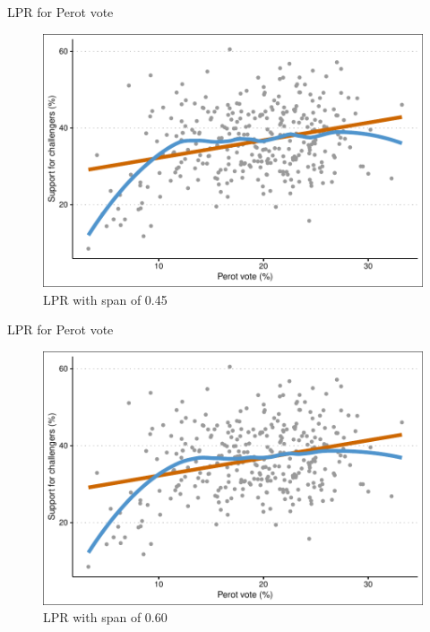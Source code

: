 \documentclass[12pt,english,pdf,xcolor=dvipsnames,aspectratio=169,handout]{beamer}\usepackage[]{graphicx}\usepackage[]{xcolor}
\begin{document}
\begin{frame}{LPR for Perot vote}

\begin{figure}
  \centering
  \includegraphics[scale=0.7]{../04-graphs/04-07b}
  \caption{LPR with span of 0.45}
\end{figure}
  
\end{frame}


\begin{frame}{LPR for Perot vote}

\begin{figure}
  \centering
  \includegraphics[scale=0.7]{../04-graphs/04-07c}
  \caption{LPR with span of 0.60}
\end{figure}
  
\end{frame}
\end{document}
